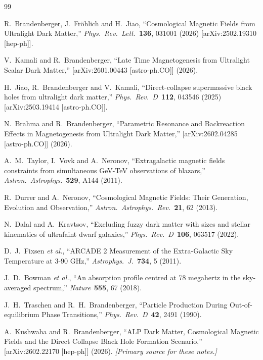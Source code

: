 \documentclass[12pt,a4paper]{report}
\theoremstyle{definition}
\begin{document}
\begin{thebibliography}{99}

R.~Brandenberger, J.~Fr\"{o}hlich and H.~Jiao,
``Cosmological Magnetic Fields from Ultralight Dark Matter,''
\textit{Phys.\ Rev.\ Lett.}\ \textbf{136}, 031001 (2026)
[arXiv:2502.19310 [hep-ph]].

V.~Kamali and R.~Brandenberger,
``Late Time Magnetogenesis from Ultralight Scalar Dark Matter,''
[arXiv:2601.00443 [astro-ph.CO]] (2026).

H.~Jiao, R.~Brandenberger and V.~Kamali,
``Direct-collapse supermassive black holes from ultralight dark matter,''
\textit{Phys.\ Rev.\ D}\ \textbf{112}, 043546 (2025)
[arXiv:2503.19414 [astro-ph.CO]].

N.~Brahma and R.~Brandenberger,
``Parametric Resonance and Backreaction Effects in Magnetogenesis from Ultralight
Dark Matter,''
[arXiv:2602.04285 [astro-ph.CO]] (2026).

A.~M.~Taylor, I.~Vovk and A.~Neronov,
``Extragalactic magnetic fields constraints from simultaneous GeV-TeV observations
of blazars,''
\textit{Astron.\ Astrophys.}\ \textbf{529}, A144 (2011).

R.~Durrer and A.~Neronov,
``Cosmological Magnetic Fields: Their Generation, Evolution and Observation,''
\textit{Astron.\ Astrophys.\ Rev.}\ \textbf{21}, 62 (2013).

N.~Dalal and A.~Kravtsov,
``Excluding fuzzy dark matter with sizes and stellar kinematics of ultrafaint
dwarf galaxies,''
\textit{Phys.\ Rev.\ D}\ \textbf{106}, 063517 (2022).

D.~J.~Fixsen \textit{et al.},
``ARCADE 2 Measurement of the Extra-Galactic Sky Temperature at 3-90 GHz,''
\textit{Astrophys.\ J.}\ \textbf{734}, 5 (2011).

J.~D.~Bowman \textit{et al.},
``An absorption profile centred at 78 megahertz in the sky-averaged spectrum,''
\textit{Nature}\ \textbf{555}, 67 (2018).

J.~H.~Traschen and R.~H.~Brandenberger,
``Particle Production During Out-of-equilibrium Phase Transitions,''
\textit{Phys.\ Rev.\ D}\ \textbf{42}, 2491 (1990).

A.~Kushwaha and R.~Brandenberger,
``ALP Dark Matter, Cosmological Magnetic Fields and the Direct Collapse Black Hole
Formation Scenario,''
[arXiv:2602.22170 [hep-ph]] (2026). \textit{[Primary source for these notes.]}

\end{thebibliography}
\end{document}
